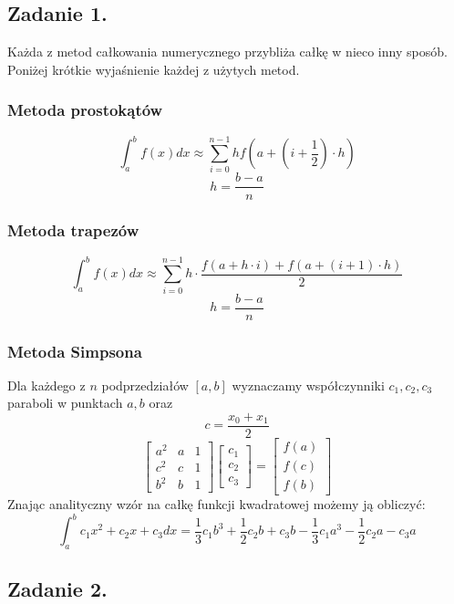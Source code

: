 \documentclass[11pt]{scrartcl}
\begin{document}
    \subsection{Zadanie 1.}
    Każda z metod całkowania numerycznego przybliża całkę w nieco
    inny sposób. Poniżej krótkie wyjaśnienie każdej z użytych
    metod.
    \subsubsection{Metoda prostokątów}
    \[
        \int_{a}^{b}f(x)dx \approx \sum_{i=0}^{n-1}hf
        \left( a+ \left( i+\frac{1}{2} \right) \cdot h \right)
    \]
    \[
        h=\frac{b-a}{n}
    \]

    \subsubsection{Metoda trapezów}
    \[
        \int_{a}^{b}f(x)dx \approx \sum_{i=0}^{n-1} h \cdot
        \frac{f(a+h \cdot i)+f(a+ (i+1) \cdot h)}{2}
    \]
    \[
        h=\frac{b-a}{n}
    \]
    \subsubsection{Metoda Simpsona}
    Dla każdego z $n$ podprzedziałów $[a,b]$ wyznaczamy
    współczynniki $c_1,c_2,c_3$ paraboli w punktach $a,b$
    oraz
    \[
        c=\frac{x_0+x_1}{2}
    \]
    \[
        \begin{bmatrix}
            a^2 & a & 1 \\
            c^2 & c & 1 \\
            b^2 & b & 1
        \end{bmatrix}
        \begin{bmatrix}
            c_1 \\
            c_2 \\
            c_3
        \end{bmatrix}
        =
        \begin{bmatrix}
            f(a) \\
            f(c) \\
            f(b)
        \end{bmatrix}
    \]
    Znając analityczny wzór na całkę funkcji kwadratowej
    możemy ją obliczyć:
    \[
        \int_{a}^{b}c_1x^2+c_2x+c_3dx=\frac{1}{3}c_1b^3+
        \frac{1}{2}c_2b+c_3b-\frac{1}{3}c_1a^3-
        \frac{1}{2}c_2a-c_3a
    \]
    \subsection{Zadanie 2.}
\end{document}
